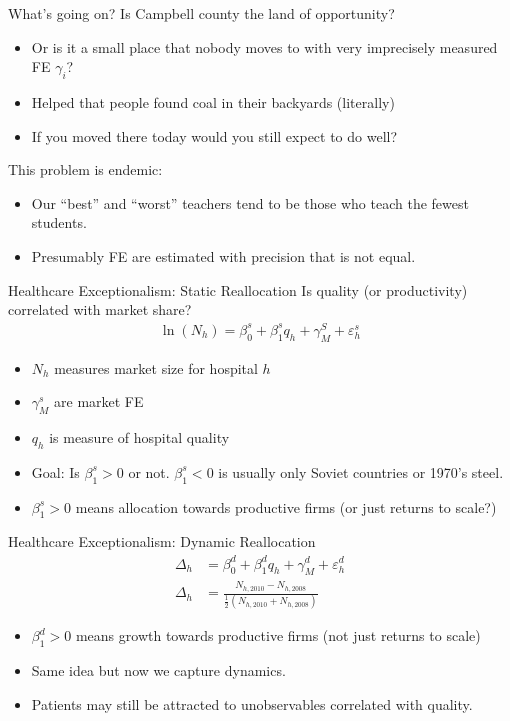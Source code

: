 \documentclass[xcolor=pdftex,dvipsnames,table,mathserif,aspectratio=169]{beamer}
\begin{document}
\begin{frame}{What's going on?}
Is Campbell county the land of opportunity?
\begin{itemize}
\item Or is it a small place that nobody moves to with very imprecisely measured FE $\gamma_i$?
\item Helped that people found coal in their backyards (literally)
\item If you moved there today would you still expect to do well?
\end{itemize}
This problem is endemic:
\begin{itemize}
\item Our ``best'' and ``worst'' teachers tend to be those who teach the fewest students.
\item Presumably FE are estimated with precision that is not equal.
\end{itemize}


\end{frame}



\begin{frame}{Healthcare Exceptionalism: Static Reallocation}
Is \alert{quality} (or productivity) correlated with \alert{market share}?
\begin{align*}
\ln \left(N_{h}\right)=\beta_{0}^{s}+\beta_{1}^{s} q_{h}+\gamma_{M}^{S}+\varepsilon_{h}^{s}
\end{align*}
\begin{itemize}
\item $N_h$ measures market size for hospital $h$
\item $\gamma_M^s$ are market FE
\item $q_h$ is measure of hospital quality
\item Goal: Is $\beta_1^s>0$ or not. $\beta_1^s<0$ is usually only Soviet countries or 1970's steel.
\item $\beta_1^s>0$ means allocation towards productive firms (or just returns to scale?)
\end{itemize}
\end{frame}

\begin{frame}{Healthcare Exceptionalism: Dynamic Reallocation}
\begin{align*}
\Delta_{h}&=\beta_{0}^{d}+\beta_{1}^{d} q_{h}+\gamma_{M}^{d}+\varepsilon_{h}^{d}\\
\Delta_{h}&=\frac{N_{h, 2010}-N_{h, 2008}}{\frac{1}{2}\left(N_{h, 2010}+N_{h, 2008}\right)}
\end{align*}
\begin{itemize}
\item $\beta_1^d>0$ means growth towards productive firms (not just returns to scale)
\item Same idea but now we capture \alert{dynamics}.
\item Patients may still be attracted to \alert{unobservables correlated with quality}.
\end{itemize}
\end{frame}
\end{document}
